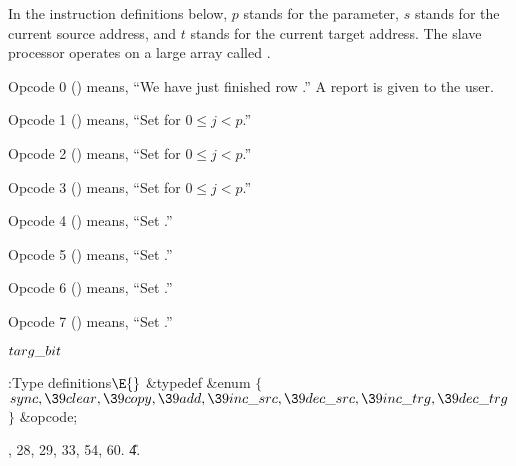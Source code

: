 In the instruction definitions below, $p$ stands for the parameter,
$s$ stands for the current source address, and $t$ stands for the
current target address. The slave processor operates on a large
array called .

Opcode 0 () means, ``We have just finished row .'' A
report
is given to the user.

Opcode 1 () means, ``Set  for $0%
\le j< p$.''

Opcode 2 () means, ``Set  for $0\le j<p$.''

Opcode 3 () means, ``Set  for $0\le j<p$.''

Opcode 4 () means, ``Set .''

Opcode 5 () means, ``Set .''

Opcode 6 () means, ``Set .''

Opcode 7 () means, ``Set .''

\Y\B\4\D$\\{targ\_bit}$ \5
\par
\Y\B\4:Type definitions\X${}\E{}$\6
\&{typedef} \&{enum} ${}\{{}$\1\6
${}\\{sync},\39\\{clear},\39\\{copy},\39\\{add},\39\\{inc\_src},\39\\{dec%
\_src},\39\\{inc\_trg},\39\\{dec\_trg}{}$\2\6
${}\}{}$ \&{opcode};\par
{}, 28, 29, 33, 54, 60.
\U4.\fi


